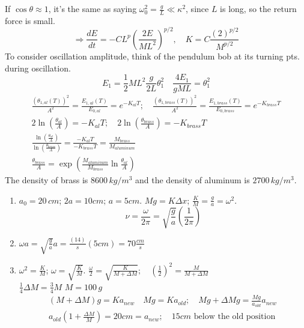 \documentclass[twoside,10pt]{amsart}
\newcommand{\problemhead}[1]
  {\smallskip
   \noindent{\large\bf Problem #1.}
   \smallskip}
\begin{document}
If $\cos{\theta} \approx 1$, it's the same as saying $\omega_0^2 = \frac{g}{L} \ll \kappa^2$, since $L$ is long, so the return force is small.  
\[
\Longrightarrow \frac{dE}{dt} = - CL^p \left( \frac{2E}{ML^2} \right)^{p/2}, \quad K = C \frac{ (2)^{p/2}}{ M^{p/2}} 
\]
To consider oscillation amplitude, think of the pendulum bob at its turning pts. during oscillation.  
\[
E_1 = \frac{1}{2} ML^2 \frac{g}{2L} \theta_1^2 \quad \frac{4 E_1}{gML} = \theta_1^2
\]
\[
\begin{gathered}
  \frac{ (\theta_{1,al}(T))^2 }{ A^2} = \frac{E_{1,al}(T)}{ E_{0,al}} = e^{-K_{al}T}; \quad \frac{ (\theta_{1,brass}(T))^2}{ A^2 } = \frac{ E_{1,brass}(T)}{ E_{0,brass} } = e^{-K_{brass} T } \\
  2 \ln{ \left( \frac{\theta_{al}}{ A} \right) } = -K_{al} T ; \quad 2 \ln{ \left( \frac{ \theta_{brass}}{A} \right) } = -K_{brass} T \\
  \frac{ \ln{ \left( \frac{\theta_{al}}{ A } \right) } }{ \ln{ \left( \frac{ \theta_{brass}}{ A } \right) }} = \frac{ -K_{al} T}{ -K_{brass} T} = \frac{M_{brass}}{ M_{aluminum}} \\
    \frac{\theta_{brass}}{A} = \exp{\left( \frac{ M_{aluminum}}{ M_{brass}}  \ln{  \frac{ \theta_{al}}{A } } \right) }
\end{gathered}
\]
The density of brass is $8600 \, kg/m^3$ and the density of aluminum is $2700 \, kg/m^3$.  

\problemhead{1.10} 
\begin{enumerate}
\item $a_0 = 20 \, cm$; \quad $2a = 10 cm; \, a=5 cm$.  \quad $Mg = K \Delta x$; \quad $\frac{K}{M} = \frac{g}{a} = \omega^2$.  
\[
\nu = \frac{\omega }{2\pi} = \sqrt{ \frac{g}{a} } \left( \frac{1}{ 2\pi } \right) 
\]
\item $\omega a = \sqrt{ \frac{g}{a} } a = \frac{ (14) }{ s } (5 cm ) = \boxed{ 70 \frac{cm}{s} }$
\item $\omega^2 = \frac{K}{M}$; \quad $\omega = \sqrt{ \frac{K}{M} }$.  \quad $\frac{ \omega}{2} = \sqrt{ \frac{K}{ M + \Delta M } }; \quad \left( \frac{1}{2} \right)^2 = \frac{M}{M +\Delta M }$ \\
$\frac{1}{4} \Delta M = \frac{3}{4} M $ \quad $\boxed{ M = 100 \, g } $  \\
\[
\begin{gathered}
  (M+\Delta M)g = K a_{new} \quad Mg = K a_{old}; \quad Mg + \Delta M g = \frac{Mg}{ a_{old} } a_{new} \\
  a_{old} \left( 1 + \frac{\Delta M}{M} \right) = 20 cm = a_{new}; \quad 15 cm \text{ below the old position }
\end{gathered}
\]
\end{enumerate}
\end{document}
